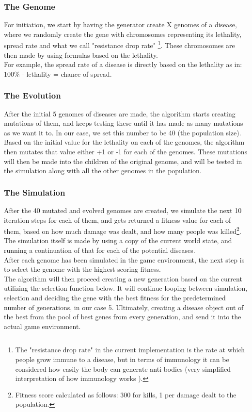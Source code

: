 \documentclass[conference,compsoc]{IEEEtran}
\begin{document}
\subsubsection{The Genome}
For initiation, we start by having the generator create X genomes of a disease, where we randomly create the gene with chromosomes representing its lethality, spread rate and what we call "resistance drop rate" \footnote{The "resistance drop rate" in the current implementation is the rate at which people grow immune to a disease, but in terms of immunology it can be considered how easily the body can generate anti-bodies (very simplified interpretation of how immunology works \cite{DSDimmunology}).}. These chromosomes are then made by using formulas based on the lethality.\\
For example, the spread rate of a disease is directly based on the lethality as in: 100\% - lethality = chance of spread.\\

\subsubsection{The Evolution}
After the initial 5 genomes of diseases are made, the algorithm starts creating mutations of them, and keeps testing these until it has made as many mutations as we want it to. In our 	case, we set this number to be 40 (the population size).\\
Based on the initial value for the lethality on each of the genomes, the algorithm then mutates that value either +1 or -1 for each of the genomes. These mutations will then be made into the children of the original genome, and will be tested in the simulation along with all the other genomes in the population.\\

\subsubsection{The Simulation}
After the 40 mutated and evolved genomes are created, we simulate the next 10 iteration steps for each of them, and gets returned a fitness value for each of them, based on how much damage was dealt, and how many people was killed\footnote{Fitness score calculated as follows: 300 for kills, 1 per damage dealt to the population.}.\\
The simulation itself is made by using a copy of the current world state, and running a continuation of that for each of the potential diseases.\\
After each genome has been simulated in the game environment, the next step is to select the genome with the highest scoring fitness.\\
The algorithm will then proceed creating a new generation based on the current utilizing the selection function below. It will continue looping between simulation, selection and deciding the gene with the best fitness for the predetermined number of generations, in our case 5. Ultimately, creating a disease object out of the best from the pool of best genes from every generation, and send it into the actual game environment.\\
\end{document}
